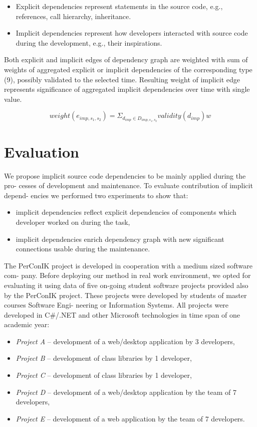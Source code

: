 \documentclass[a4paper]{llncs}
\begin{document}
 \begin{itemize}
 \item 
 Explicit dependencies represent statements in the source code, e.g., references, call hierarchy, inheritance.
 \item 
 Implicit dependencies represent how developers interacted with source code during the development, e.g., their inspirations.
 \end{itemize}
 
 \noindent
 Both explicit and implicit edges of dependency graph are weighted with sum of weights of aggregated explicit or implicit dependencies of the corresponding type (9), possibly validated to the selected time. Resulting weight of implicit edge represents significance of aggregated implicit dependencies over time with single value.
 
 \begin{equation}
 weight(e_{imp,s_{1},s_{2}}) = \Sigma_{d_{imp}\in D_{imp,s_{1},s_{2}}} validity(d_{imp}) w
 \end{equation}
 
 \section{Evaluation}
 We propose implicit source code dependencies to be mainly applied during the pro- cesses of development and maintenance. To evaluate contribution of implicit depend- encies we performed two experiments to show that:
 
 \begin{itemize}
 \item
 implicit dependencies reflect explicit dependencies of components which developer worked on during the task,
 \item
 implicit dependencies enrich dependency graph with new significant connections usable during the maintenance.
 \end{itemize}
 
\noindent
The PerConIK project is developed in cooperation with a medium sized software com- pany. Before deploying our method in real work environment, we opted for evaluating it using data of five on-going student software projects provided also by the PerConIK project. These projects were developed by students of master courses Software Engi- neering or Information Systems. All projects were developed in C\#/.NET and other Microsoft technologies in time span of one academic year:
 \newpage
 \begin{itemize}
 \item
 \textit{Project A} -- development of a web/desktop application by 3 developers,
  \item
 \textit{Project B} -- development of class libraries by 1 developer,
  \item
 \textit{Project C} -- development of class libraries by 1 developer,
  \item
 \textit{Project D} -- development of a web/desktop application by the team of 7 developers,
  \item
 \textit{Project E} -- development of a web application by the team of 7 developers.
\end{itemize}
\end{document}
